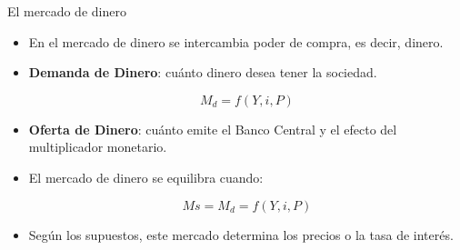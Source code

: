 \documentclass{beamer}
\begin{document}
\begin{frame}{El mercado de dinero}
\begin{itemize}
    \item En el mercado de dinero se intercambia  poder de compra, es decir, dinero.  \vspace{2mm}
    \item \textbf{Demanda de Dinero}: cuánto dinero desea tener la sociedad. 
            \begin{center}
            \begin{tcolorbox}[width=2in, boxsep=0pt, left=0pt, right=0pt, top=2pt,colframe = blue!70!black, colback = blue!7!white]%
                    $$ M_{d}=f(Y, i, P) $$
             \end{tcolorbox}
             \end{center} 
     \item \textbf{Oferta de Dinero}: cuánto emite el Banco Central y el efecto del multiplicador monetario.  
     \vspace{2mm}
     \item El mercado de dinero se equilibra cuando:
     \begin{center}
            \begin{tcolorbox}[width=2.5in, boxsep=0pt, left=0pt, right=0pt, top=2pt,colframe = blue!70!black, colback = blue!7!white]%
                    $$Ms= M_{d}=f(Y, i, P) $$
             \end{tcolorbox}
             \end{center} 
    \item Según los supuestos, este mercado determina los precios o la tasa de interés. 
\end{itemize}
\end{frame}
\end{document}
